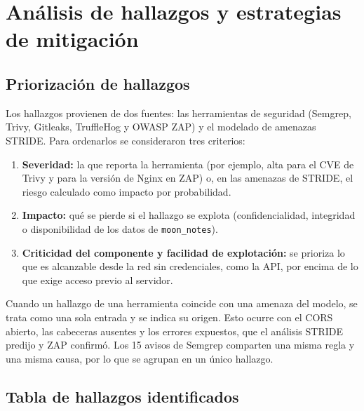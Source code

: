 
\chapter{Análisis de hallazgos y estrategias de mitigación}

\section{Priorización de hallazgos}

Los hallazgos provienen de dos fuentes: las herramientas de seguridad
(Semgrep, Trivy, Gitleaks, TruffleHog y OWASP ZAP) y el modelado de amenazas
STRIDE. Para ordenarlos se consideraron tres criterios:

\begin{enumerate}
    \item \textbf{Severidad:} la que reporta la herramienta (por ejemplo,
    alta para el CVE de Trivy y para la versión de Nginx en ZAP) o, en las
    amenazas de STRIDE, el riesgo calculado como impacto por probabilidad.
    \item \textbf{Impacto:} qué se pierde si el hallazgo se explota
    (confidencialidad, integridad o disponibilidad de los datos de
    \texttt{moon\_notes}).
    \item \textbf{Criticidad del componente y facilidad de explotación:} se
    prioriza lo que es alcanzable desde la red sin credenciales, como la API,
    por encima de lo que exige acceso previo al servidor.
\end{enumerate}

Cuando un hallazgo de una herramienta coincide con una amenaza del modelo, se
trata como una sola entrada y se indica su origen. Esto ocurre con el CORS
abierto, las cabeceras ausentes y los errores expuestos, que el análisis
STRIDE predijo y ZAP confirmó. Los 15 avisos de Semgrep comparten una misma
regla y una misma causa, por lo que se agrupan en un único hallazgo.

\section{Tabla de hallazgos identificados}

